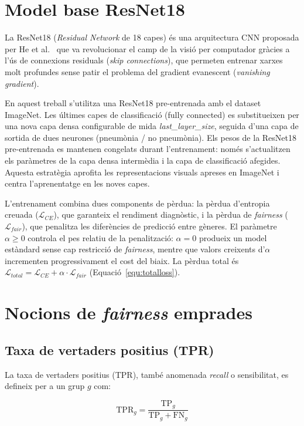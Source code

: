 \documentclass[a4paper,12pt,twoside]{ThesisStyle}
\begin{document}
\section{Model base ResNet18}

La ResNet18 (\textit{Residual Network} de 18 capes) és una arquitectura CNN proposada per He et al.\ \cite{He2016} que va revolucionar el camp de la visió per computador gràcies a l'ús de connexions residuals (\textit{skip connections}), que permeten entrenar xarxes molt profundes sense patir el problema del gradient evanescent (\textit{vanishing gradient}).

En aquest treball s'utilitza una ResNet18 pre-entrenada amb el dataset ImageNet. Les últimes capes de classificació (fully connected) es substitueixen per una nova capa densa configurable de mida \textit{last\_layer\_size}, seguida d'una capa de sortida de dues neurones (pneumònia / no pneumònia). Els pesos de la ResNet18 pre-entrenada es mantenen congelats durant l'entrenament: només s'actualitzen els paràmetres de la capa densa intermèdia i la capa de classificació afegides. Aquesta estratègia aprofita les representacions visuals apreses en ImageNet i centra l'aprenentatge en les noves capes.

L'entrenament combina dues components de pèrdua: la pèrdua d'entropia creuada ($\mathcal{L}_{CE}$), que garanteix el rendiment diagnòstic, i la pèrdua de \textit{fairness} ($\mathcal{L}_{fair}$), que penalitza les diferències de predicció entre gèneres. El paràmetre $\alpha \geq 0$ controla el pes relatiu de la penalització: $\alpha = 0$ produeix un model estàndard sense cap restricció de \textit{fairness}, mentre que valors creixents d'$\alpha$ incrementen progressivament el cost del biaix. La pèrdua total és $\mathcal{L}_{total} = \mathcal{L}_{CE} + \alpha \cdot \mathcal{L}_{fair}$ (Equació~\ref{equ:totalloss}).

\section{Nocions de \textit{fairness} emprades}

\subsection{Taxa de vertaders positius (TPR)}

La taxa de vertaders positius (TPR), també anomenada \textit{recall} o sensibilitat, es defineix per a un grup $g$ com:

\begin{equation}
    \text{TPR}_g = \frac{\text{TP}_g}{\text{TP}_g + \text{FN}_g}
    \label{equ:tpr}
\end{equation}
\end{document}
